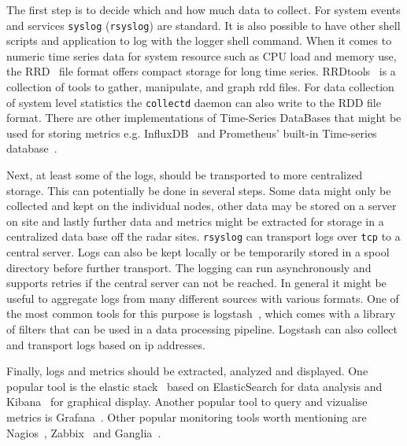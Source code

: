 \documentclass[12pt,a4paper]{article}
\begin{document}
The first step is to decide which and how much data to collect. 
For system events and services {\tt syslog} ({\tt rsyslog}) are standard. 
It is also possible to have other shell scripts and application to log with the logger shell command. 
When it comes to numeric time series data for system resource such as CPU load and memory use, the RRD~\cite{rrdtool} file format offers compact storage for long time series. 
RRDtools~\cite{rrdtool} is a collection of tools to gather, manipulate, and graph rdd files. 
For data collection of system level statistics the {\tt collectd} daemon can also write to the RDD file format.
There are other implementations of Time-Series DataBases that might be used for storing metrics e.g. InfluxDB~\cite{influxdb} and Prometheus' built-in Time-series database~\cite{prometheus}.


Next, at least some of the logs, should be transported to more centralized storage. 
This can potentially be done in several steps. 
Some data might only be collected and kept on the individual nodes, other data may be stored on a server on site and lastly further data and metrics might be extracted for storage in a centralized data base off the radar sites.
{\tt rsyslog} can transport logs over {\tt tcp} to a central server.
Logs can also be kept locally or be temporarily stored in a spool directory before further transport. 
The logging can run asynchronously and supports retries if the central server can not be reached. 
In general it might be useful to aggregate logs from many different sources with various formats. One of the most common tools for this purpose is logstash~\cite{logstash}, which comes with a library of filters that can be used in a data processing pipeline. Logstash can also collect and transport logs based on ip addresses. 


Finally, logs and metrics should be extracted, analyzed and displayed. One popular tool is the elastic stack~\cite{elastic} based on ElasticSearch for data analysis and Kibana~\cite{kibana} for graphical display. 
Another popular tool to query and vizualise metrics is Grafana~\cite{grafana}. Other popular monitoring tools worth mentioning are Nagios~\cite{nagios}, Zabbix~\cite{zabbix} and Ganglia~\cite{ganglia}.
\end{document}

